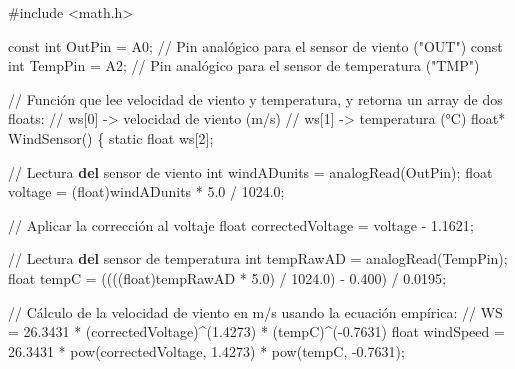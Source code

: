 \documentclass[
  letterpaper,
]{scrbook}
\newenvironment{Shaded}{\begin{snugshade}}{\end{snugshade}}
\newcommand{\BuiltInTok}[1]{\textcolor[rgb]{0.00,0.23,0.31}{#1}}
\newcommand{\CommentTok}[1]{\textcolor[rgb]{0.37,0.37,0.37}{#1}}
\newcommand{\DecValTok}[1]{\textcolor[rgb]{0.68,0.00,0.00}{#1}}
\newcommand{\FloatTok}[1]{\textcolor[rgb]{0.68,0.00,0.00}{#1}}
\newcommand{\KeywordTok}[1]{\textcolor[rgb]{0.00,0.23,0.31}{\textbf{#1}}}
\newcommand{\NormalTok}[1]{\textcolor[rgb]{0.00,0.23,0.31}{#1}}
\newcommand{\OperatorTok}[1]{\textcolor[rgb]{0.37,0.37,0.37}{#1}}
\newcommand{\StringTok}[1]{\textcolor[rgb]{0.13,0.47,0.30}{#1}}
\begin{document}
\begin{Shaded}
\begin{Highlighting}[]
\CommentTok{\#include \textless{}math.h\textgreater{}}

\NormalTok{const }\BuiltInTok{int}\NormalTok{ OutPin  }\OperatorTok{=}\NormalTok{ A0}\OperatorTok{;}   \OperatorTok{//}\NormalTok{ Pin analógico para el sensor de viento (}\StringTok{"OUT"}\NormalTok{)}
\NormalTok{const }\BuiltInTok{int}\NormalTok{ TempPin }\OperatorTok{=}\NormalTok{ A2}\OperatorTok{;}   \OperatorTok{//}\NormalTok{ Pin analógico para el sensor de temperatura (}\StringTok{"TMP"}\NormalTok{)}

\OperatorTok{//}\NormalTok{ Función que lee velocidad de viento y temperatura, y retorna un array de dos floats:}
\OperatorTok{//}\NormalTok{ ws[}\DecValTok{0}\NormalTok{] }\OperatorTok{{-}\textgreater{}}\NormalTok{ velocidad de viento (m}\OperatorTok{/}\NormalTok{s)}
\OperatorTok{//}\NormalTok{ ws[}\DecValTok{1}\NormalTok{] }\OperatorTok{{-}\textgreater{}}\NormalTok{ temperatura (°C)}
\BuiltInTok{float}\OperatorTok{*}\NormalTok{ WindSensor() \{}
\NormalTok{  static }\BuiltInTok{float}\NormalTok{ ws[}\DecValTok{2}\NormalTok{]}\OperatorTok{;}
  
  \OperatorTok{//}\NormalTok{ Lectura }\KeywordTok{del}\NormalTok{ sensor de viento}
  \BuiltInTok{int}\NormalTok{ windADunits }\OperatorTok{=}\NormalTok{ analogRead(OutPin)}\OperatorTok{;}
  \BuiltInTok{float}\NormalTok{ voltage }\OperatorTok{=}\NormalTok{ (}\BuiltInTok{float}\NormalTok{)windADunits }\OperatorTok{*} \FloatTok{5.0} \OperatorTok{/} \FloatTok{1024.0}\OperatorTok{;}
  
  \OperatorTok{//}\NormalTok{ Aplicar la corrección al voltaje}
  \BuiltInTok{float}\NormalTok{ correctedVoltage }\OperatorTok{=}\NormalTok{ voltage }\OperatorTok{{-}} \FloatTok{1.1621}\OperatorTok{;}
  
  \OperatorTok{//}\NormalTok{ Lectura }\KeywordTok{del}\NormalTok{ sensor de temperatura}
  \BuiltInTok{int}\NormalTok{ tempRawAD }\OperatorTok{=}\NormalTok{ analogRead(TempPin)}\OperatorTok{;}
  \BuiltInTok{float}\NormalTok{ tempC }\OperatorTok{=}\NormalTok{ ((((}\BuiltInTok{float}\NormalTok{)tempRawAD }\OperatorTok{*} \FloatTok{5.0}\NormalTok{) }\OperatorTok{/} \FloatTok{1024.0}\NormalTok{) }\OperatorTok{{-}} \FloatTok{0.400}\NormalTok{) }\OperatorTok{/} \FloatTok{0.0195}\OperatorTok{;}
  
  \OperatorTok{//}\NormalTok{ Cálculo de la velocidad de viento en m}\OperatorTok{/}\NormalTok{s usando la ecuación empírica:}
  \OperatorTok{//}\NormalTok{ WS }\OperatorTok{=} \FloatTok{26.3431} \OperatorTok{*}\NormalTok{ (correctedVoltage)}\OperatorTok{\^{}}\NormalTok{(}\FloatTok{1.4273}\NormalTok{) }\OperatorTok{*}\NormalTok{ (tempC)}\OperatorTok{\^{}}\NormalTok{(}\OperatorTok{{-}}\FloatTok{0.7631}\NormalTok{)}
  \BuiltInTok{float}\NormalTok{ windSpeed }\OperatorTok{=} \FloatTok{26.3431} \OperatorTok{*} \BuiltInTok{pow}\NormalTok{(correctedVoltage, }\FloatTok{1.4273}\NormalTok{) }\OperatorTok{*} \BuiltInTok{pow}\NormalTok{(tempC, }\OperatorTok{{-}}\FloatTok{0.7631}\NormalTok{)}\OperatorTok{;}
  

\end{Highlighting}
\end{Shaded}
\end{document}
